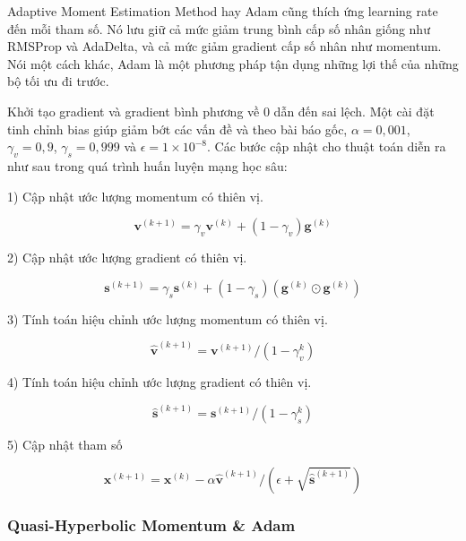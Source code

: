 Adaptive Moment Estimation Method hay Adam cũng thích ứng learning rate đến mỗi tham số. Nó lưu giữ cả mức giảm trung bình cấp số nhân giống như RMSProp và AdaDelta, và cả mức giảm gradient cấp số nhân như momentum. Nói một cách khác, Adam là một phương pháp tận dụng những lợi thế của những bộ tối ưu đi trước.

Khởi tạo gradient và gradient bình phương về 0 dẫn đến sai lệch. Một cài đặt tinh chỉnh bias giúp giảm bớt các vấn đề và theo bài báo gốc, $\alpha = 0,001 $, $ \gamma_v = 0,9 $, $ \gamma_s = 0,999 $ và $ \epsilon = 1 \times 10 ^ {- 8} $. Các bước cập nhật cho thuật toán diễn ra như sau trong quá trình huấn luyện mạng học sâu:

1) Cập nhật ước lượng momentum có thiên vị.

\begin{equation}
    \mathbf{v}^{(k+1)} = \gamma_v\mathbf{v}^{(k)} + (1-\gamma_v)\mathbf{g}^{(k)}
\end{equation}

2) Cập nhật ước lượng gradient có thiên vị.

\begin{equation}
    \mathbf{s}^{(k+1)} = \gamma_s\mathbf{s}^{(k)} + (1-\gamma_s)\left(\mathbf{g}^{(k)} \odot \mathbf{g}^{(k)}\right)
\end{equation}

3) Tính toán hiệu chỉnh ước lượng momentum có thiên vị.

\begin{equation}
    \hat{\mathbf{v}}^{(k+1)} = \mathbf{v}^{(k+1)} / (1-\gamma_v^k)
\end{equation}

4) Tính toán hiệu chỉnh ước lượng gradient có thiên vị.

\begin{equation}
    \hat{\mathbf{s}}^{(k+1)} = \mathbf{s}^{(k+1)} / (1-\gamma_s^k)
\end{equation}

5) Cập nhật tham số

\begin{equation}
    \mathbf{x}^{(k+1)} = \mathbf{x}^{(k)} - \alpha\hat{\mathbf{v}}^{(k+1)} / \left(\epsilon + \sqrt{\hat{\mathbf{s}}^{(k+1)}}\right)
\end{equation}

\subsubsection{Quasi-Hyperbolic Momentum \& Adam}

